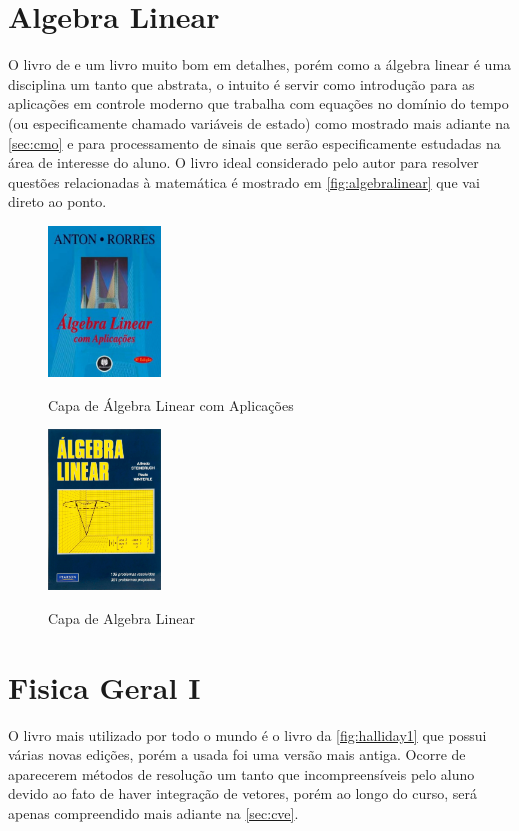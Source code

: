 \documentclass[
	12pt,				%
	openright,			%
	oneside,			%
	a4paper,			%
	english,			%
	french,				%
	spanish,			%
	brazil				%
	]{abntex2}
\begin{document}
\section{Algebra Linear}\label{sec:alg2}
O livro de  e um livro muito bom em detalhes, porém como a álgebra linear é uma disciplina um tanto que abstrata, o intuito  é servir como introdução para as aplicações em controle moderno que trabalha com equações no domínio do tempo (ou especificamente chamado variáveis de estado) como mostrado mais adiante na \autoref{sec:cmo} e para processamento de sinais que serão especificamente estudadas na área de interesse do aluno. O livro ideal considerado pelo autor para resolver questões relacionadas à matemática é  mostrado em \autoref{fig:algebralinear} que vai direto ao ponto.
\begin{figure}[!htb]
	\caption{Capa de Álgebra Linear com Aplicações}
	\centering
	\includegraphics[width=3cm]{antonalg2.jpg}
	\label{fig:antonalg2}
\end{figure}
\begin{figure}[!htb]
	\caption{Capa de Algebra Linear}
	\centering
	\includegraphics[width=3cm]{algebralinear.jpg}
	\label{fig:algebralinear}
\end{figure}


\section{Fisica Geral I}\label{sec:fge1}
O livro mais utilizado por todo o mundo é o livro da \autoref{fig:halliday1} que possui várias novas edições, porém a usada foi uma versão mais antiga. Ocorre de aparecerem métodos de resolução um tanto que incompreensíveis pelo aluno devido ao fato de haver integração de vetores, porém ao longo do curso, será apenas compreendido mais adiante na \autoref{sec:cve}.
\end{document}
